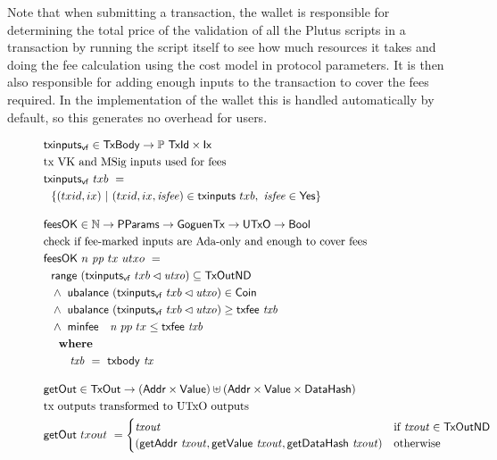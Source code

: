 Note that when submitting a transaction, the wallet is responsible for
determining the total price of the
validation of all the Plutus scripts in a transaction
by running the script itself to see how much resources it takes and doing the
fee calculation using the cost model in protocol parameters. It is then
also responsible for adding enough inputs to the transaction to cover the
fees required. In the implementation of the wallet this is handled
automatically by default, so this generates no overhead for users.

\begin{figure}[htb]
  \begin{align*}
    & \fun{txinputs_{vf}} \in \TxBody \to \powerset{\TxId \times \Ix} \\
    & \text{tx VK and MSig inputs used for fees} \\
    & \fun{txinputs_{vf}} ~txb~= \\
    &~~\{ (txid,ix)~\vert~(txid,ix,\var{isfee}) \in
    \fun{txinputs} ~txb,~
     \var{isfee}\in\Yes\}
    \nextdef
    & \fun{feesOK} \in \N \to \PParams \to \GoguenTx \to \UTxO \to \Bool  \\
    & \text{check if fee-marked inputs are Ada-only and enough to cover fees} \\
    & \fun{feesOK} ~n~\var{pp}~tx~utxo~= \\
    &~~\fun{range}~(\fun{txinputs_{vf}}~{txb} \restrictdom \var{utxo}) \subseteq \TxOutND ~ \\
    &~~\wedge~ \fun{ubalance}~(\fun{txinputs_{vf}}~{txb} \restrictdom \var{utxo}) \in \Coin \\
    &~~      \wedge~ \fun{ubalance}~(\fun{txinputs_{vf}}~{txb} \restrictdom \var{utxo}) \geq \txfee{txb} ~ \\
    &~~      \wedge~ \minfee~n~{pp}~{tx} \leq \txfee{txb} \\
    &~~      \where \\
    & ~~~~~~~ \var{txb}~=~\txbody{tx}
    \nextdef
    & \fun{getOut} \in \TxOut \to (\Addr \times \Value) \uniondistinct (\Addr \times \Value \times \DataHash)  \\
    & \text{tx outputs transformed to UTxO outputs} \\
    & \fun{getOut} ~{txout}~= \begin{cases}
         \var{txout}  & \text{if~} \var{txout} \in \TxOutND \\
              (\fun{getAddr}~\var{txout}, \fun{getValue}~\var{txout},
              \fun{getDataHash}~\var{txout}) & \text{otherwise}

\end{cases}
\end{align*}
\end{figure}
